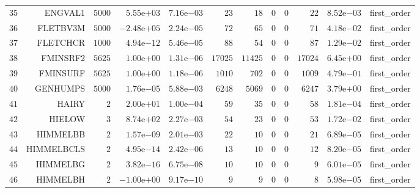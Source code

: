 \begin{longtable}{rrrrrrrrrrrr}
  \(    35\) & ENGVAL1 & \(  5000\) & \( 5.55\)e\(+03\) & \( 7.16\)e\(-03\) & \(    23\) & \(    18\) & \(     0\) & \(     0\) & \(    22\) & \( 8.52\)e\(-03\) & first\_order \\
  \(    36\) & FLETBV3M & \(  5000\) & \(-2.48\)e\(+05\) & \( 2.24\)e\(-05\) & \(    72\) & \(    65\) & \(     0\) & \(     0\) & \(    71\) & \( 4.18\)e\(-02\) & first\_order \\
  \(    37\) & FLETCHCR & \(  1000\) & \( 4.94\)e\(-12\) & \( 5.46\)e\(-05\) & \(    88\) & \(    54\) & \(     0\) & \(     0\) & \(    87\) & \( 1.29\)e\(-02\) & first\_order \\
  \(    38\) & FMINSRF2 & \(  5625\) & \( 1.00\)e\(+00\) & \( 1.31\)e\(-06\) & \( 17025\) & \( 11425\) & \(     0\) & \(     0\) & \( 17024\) & \( 6.45\)e\(+00\) & first\_order \\
  \(    39\) & FMINSURF & \(  5625\) & \( 1.00\)e\(+00\) & \( 1.18\)e\(-06\) & \(  1010\) & \(   702\) & \(     0\) & \(     0\) & \(  1009\) & \( 4.79\)e\(-01\) & first\_order \\
  \(    40\) & GENHUMPS & \(  5000\) & \( 1.76\)e\(-05\) & \( 5.88\)e\(-03\) & \(  6248\) & \(  5069\) & \(     0\) & \(     0\) & \(  6247\) & \( 3.79\)e\(+00\) & first\_order \\
  \(    41\) & HAIRY & \(     2\) & \( 2.00\)e\(+01\) & \( 1.00\)e\(-04\) & \(    59\) & \(    35\) & \(     0\) & \(     0\) & \(    58\) & \( 1.81\)e\(-04\) & first\_order \\
  \(    42\) & HIELOW & \(     3\) & \( 8.74\)e\(+02\) & \( 2.27\)e\(-03\) & \(    54\) & \(    23\) & \(     0\) & \(     0\) & \(    53\) & \( 1.72\)e\(-02\) & first\_order \\
  \(    43\) & HIMMELBB & \(     2\) & \( 1.57\)e\(-09\) & \( 2.01\)e\(-03\) & \(    22\) & \(    10\) & \(     0\) & \(     0\) & \(    21\) & \( 6.89\)e\(-05\) & first\_order \\
  \(    44\) & HIMMELBCLS & \(     2\) & \( 4.95\)e\(-14\) & \( 2.42\)e\(-06\) & \(    13\) & \(    10\) & \(     0\) & \(     0\) & \(    12\) & \( 8.20\)e\(-05\) & first\_order \\
  \(    45\) & HIMMELBG & \(     2\) & \( 3.82\)e\(-16\) & \( 6.75\)e\(-08\) & \(    10\) & \(    10\) & \(     0\) & \(     0\) & \(     9\) & \( 6.01\)e\(-05\) & first\_order \\
  \(    46\) & HIMMELBH & \(     2\) & \(-1.00\)e\(+00\) & \( 9.17\)e\(-10\) & \(     9\) & \(     9\) & \(     0\) & \(     0\) & \(     8\) & \( 5.98\)e\(-05\) & first\_order \\

\end{longtable}
